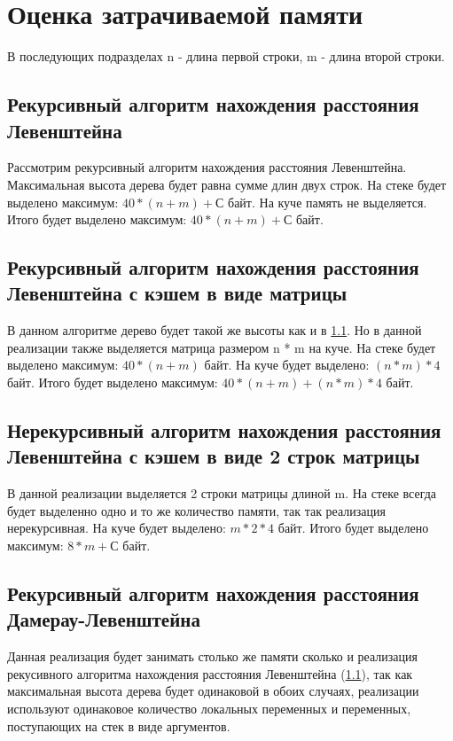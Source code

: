 \documentclass{report}
\begin{document}
\section{Оценка затрачиваемой памяти}

В последующих подразделах n - длина первой строки, m - длина второй строки.

\subsection{Рекурсивный алгоритм нахождения расстояния Левенштейна}\label{recmem}
Рассмотрим рекурсивный алгоритм нахождения расстояния Левенштейна.
Максимальная высота дерева будет равна сумме длин двух строк.\newline
На стеке будет выделено максимум: $40 * (n + m) + С$ байт.\newline
На куче память не выделяется.\newline
Итого будет выделено максимум:  $40 * (n + m) + С$ байт.

\subsection{Рекурсивный алгоритм нахождения расстояния Левенштейна с кэшем в виде матрицы}
В данном алгоритме дерево будет такой же высоты как и в \ref{recmem}. Но в данной реализации также выделяется матрица размером n * m на куче.\newline
На стеке будет выделено максимум: $40 * (n + m)$ байт.\newline
На куче будет выделено: $(n * m) * 4 $ байт.\newline
Итого будет выделено максимум:  $40 * (n + m) + (n * m) * 4$ байт.

\subsection{Нерекурсивный алгоритм нахождения расстояния Левенштейна с кэшем в виде 2 строк матрицы}
В данной реализации выделяется 2 строки матрицы длиной m.
На стеке всегда будет выделенно одно и то же количество памяти, так так реализация нерекурсивная.\newline
На куче будет выделено: $m * 2 * 4$ байт.\newline
Итого будет выделено максимум:  $8 * m + С$ байт.

\subsection{Рекурсивный алгоритм нахождения расстояния Дамерау-Левенштейна}
Данная реализация будет занимать столько же памяти сколько и реализация рекусивного алгоритма нахождения расстояния Левенштейна (\ref{recmem}), так как максимальная высота дерева будет одинаковой в обоих случаях, реализации используют одинаковое количество локальных переменных и переменных, поступающих на стек в виде аргументов.
\end{document}
